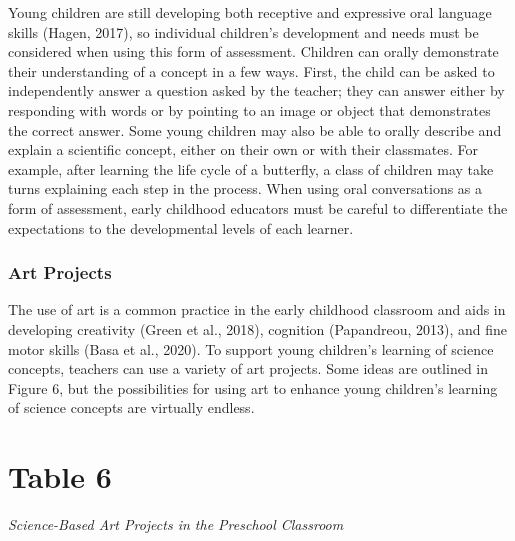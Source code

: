 \documentclass[11.5pt]{sig-alternate}
\begin{document}
\begin{large}
Young children are still developing both receptive and expressive oral language skills (Hagen, 2017), so individual children’s development and needs must be considered when using this form of assessment. Children can orally demonstrate their understanding of a concept in a few ways. First, the child can be asked to independently answer a question asked by the teacher; they can answer either by responding with words or by pointing to an image or object that demonstrates the correct answer. Some young children may also be able to orally describe and explain a scientific concept, either on their own or with their classmates. For example, after learning the life cycle of a butterfly, a class of children may take turns explaining each step in the process. When using oral conversations as a form of assessment, early childhood educators must be careful to differentiate the expectations to the developmental levels of each learner.

\subsubsection*{Art Projects }

The use of art is a common practice in the early childhood classroom and aids in developing creativity (Green et al., 2018), cognition (Papandreou, 2013), and fine motor skills (Basa et al., 2020). To support young children’s learning of science concepts, teachers can use a variety of art projects. Some ideas are outlined in Figure 6, but the possibilities for using art to enhance young children’s learning of science concepts are virtually endless.

\section*{Table 6}
\textit{Science-Based Art Projects in the Preschool Classroom}


\end{large}
\end{document}
